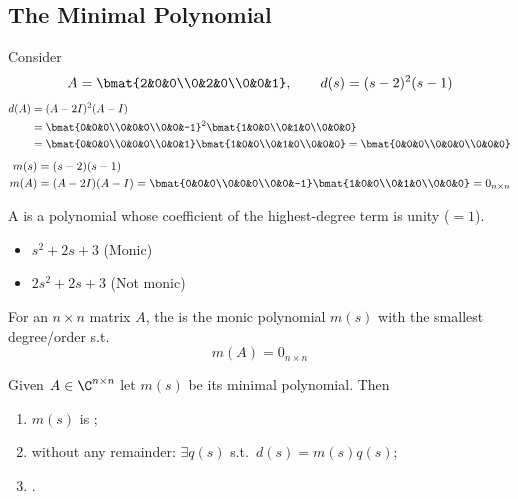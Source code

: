 \subsection{The Minimal Polynomial}\label{ss:minpoly}
Consider
\[
A=\bmat{2&0&0\\0&2&0\\0&0&1},\qquad d(s)=(s-2)^2(s-1)
\]
\begin{align*}
d(A)&=(A-2I)^2(A-I)\\
&=\bmat{0&0&0\\0&0&0\\0&0&-1}^2\bmat{1&0&0\\0&1&0\\0&0&0}\\
&=\bmat{0&0&0\\0&0&0\\0&0&1}\bmat{1&0&0\\0&1&0\\0&0&0}=\bmat{0&0&0\\0&0&0\\0&0&0}
\end{align*}
\begin{align*}
m(s)&=(s-2)(s-1)\\
m(A)&=(A-2I)(A-I)=\bmat{0&0&0\\0&0&0\\0&0&-1}\bmat{1&0&0\\0&1&0\\0&0&0}=0_{n\times n}
\end{align*}

\begin{definition}
A  is a polynomial whose coefficient of the highest-degree term is unity ($=1$).
\begin{itemize}[label=$\ast$]
\item $s^2+2s+3$ \quad (Monic)
\item $2s^2+2s+3$ \quad (Not monic)
\end{itemize}
\end{definition}
\begin{definition}
For an $n\times n$ matrix $A$, the  is the monic polynomial $m(s)$ with the smallest degree/order s.t.
\[ m(A)=0_{n\times n} \]
\end{definition}
\begin{theorem}
Given $A\in\C^{n\times n}$ let $m(s)$ be its minimal polynomial. Then
\begin{enumerate}[label=\Roman*)]
\item $m(s)$ is ;
\item {} without any remainder: $\exists q(s)$ s.t.\ $d(s)=m(s)q(s)$;
\item {}.
\end{enumerate}
\end{theorem}

